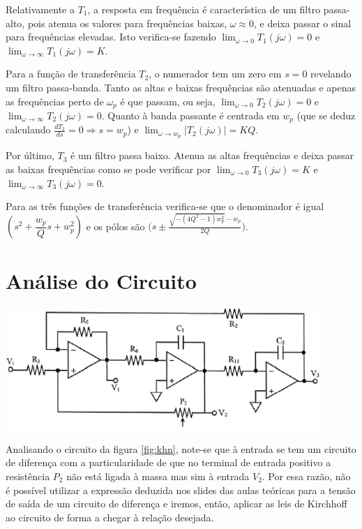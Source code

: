 \documentclass[a4paper,11pt]{report}
\begin{document}
Relativamente a $T_1$, a resposta em frequência é característica de um filtro passa-alto, pois atenua os valores para frequências baixas, $\omega\approx 0$, e deixa passar o sinal para frequências elevadas. Isto verifica-se fazendo $\lim_{\omega\to0}T_1(j\omega)=0$ e $\lim_{\omega\to\infty} T_1(j\omega)=K$.



Para a função de transferência $T_2$, o numerador tem um zero em $s=0$ revelando um filtro passa-banda. Tanto as altas e baixas frequências são atenuadas e apenas as frequências perto de $\omega_p$ é que passam, ou seja, $\lim_{\omega\to 0}T_2(j\omega)=0$ e $\lim_{\omega\to\infty}T_2(j\omega)=0$. Quanto à banda passante é centrada em $w_p$ (que se deduz calculando $\frac{dT_2}{ds}=0\Rightarrow s=w_p$) e $\lim_{\omega\to w_p}|T_2(j\omega)|=KQ$.

Por último, $T_3$ é um filtro passa baixo. Atenua as altas frequências e deixa passar as baixas frequências como se pode verificar por $\lim_{\omega\to 0}T_3(j\omega)=K$ e $\lim_{\omega\to\infty}T_3(j\omega)=0$.

Para as três funções de transferência verifica-se que o denominador é igual $(s^2+\dfrac{w_p}{Q}s+w_p^2)$ e os pólos são $\Bigg(s\pm\frac{\sqrt{-(4Q^2-1)w_p^2}-w_p}{2Q}\Bigg)$.

\section{Análise do Circuito}
\begin{center}
     \includegraphics[angle=0,width=0.9\textwidth]{khn.png}
     \label{fig:khn}
     \end{center}
     
Analisando o circuito da figura \ref{fig:khn}, note-se que à entrada se tem um circuito de diferença com a particularidade de que no terminal de entrada positivo a resistência $P_2$ não está ligada à massa mas sim à entrada $V_2$. Por essa razão, não é possível utilizar a expressão deduzida nos slides das aulas teóricas para a tensão de saída de um circuito de diferença e iremos, então, aplicar as leis de Kirchhoff ao circuito de forma a chegar à relação desejada.
\end{document}
